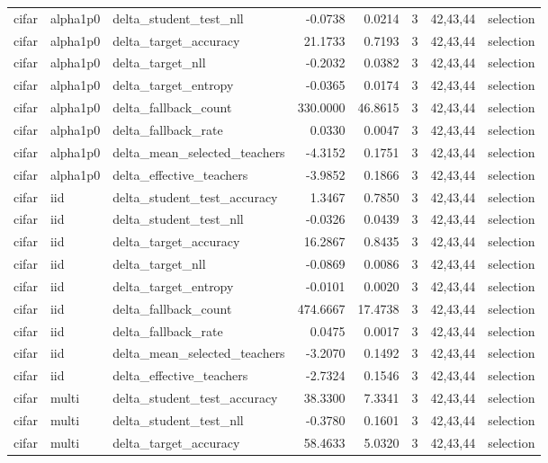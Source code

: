 \begin{tabular}{lllrrrll}
cifar & alpha1p0 & delta\_student\_test\_nll & -0.0738 & 0.0214 & 3 & 42,43,44 & selection \\
cifar & alpha1p0 & delta\_target\_accuracy & 21.1733 & 0.7193 & 3 & 42,43,44 & selection \\
cifar & alpha1p0 & delta\_target\_nll & -0.2032 & 0.0382 & 3 & 42,43,44 & selection \\
cifar & alpha1p0 & delta\_target\_entropy & -0.0365 & 0.0174 & 3 & 42,43,44 & selection \\
cifar & alpha1p0 & delta\_fallback\_count & 330.0000 & 46.8615 & 3 & 42,43,44 & selection \\
cifar & alpha1p0 & delta\_fallback\_rate & 0.0330 & 0.0047 & 3 & 42,43,44 & selection \\
cifar & alpha1p0 & delta\_mean\_selected\_teachers & -4.3152 & 0.1751 & 3 & 42,43,44 & selection \\
cifar & alpha1p0 & delta\_effective\_teachers & -3.9852 & 0.1866 & 3 & 42,43,44 & selection \\
cifar & iid & delta\_student\_test\_accuracy & 1.3467 & 0.7850 & 3 & 42,43,44 & selection \\
cifar & iid & delta\_student\_test\_nll & -0.0326 & 0.0439 & 3 & 42,43,44 & selection \\
cifar & iid & delta\_target\_accuracy & 16.2867 & 0.8435 & 3 & 42,43,44 & selection \\
cifar & iid & delta\_target\_nll & -0.0869 & 0.0086 & 3 & 42,43,44 & selection \\
cifar & iid & delta\_target\_entropy & -0.0101 & 0.0020 & 3 & 42,43,44 & selection \\
cifar & iid & delta\_fallback\_count & 474.6667 & 17.4738 & 3 & 42,43,44 & selection \\
cifar & iid & delta\_fallback\_rate & 0.0475 & 0.0017 & 3 & 42,43,44 & selection \\
cifar & iid & delta\_mean\_selected\_teachers & -3.2070 & 0.1492 & 3 & 42,43,44 & selection \\
cifar & iid & delta\_effective\_teachers & -2.7324 & 0.1546 & 3 & 42,43,44 & selection \\
cifar & multi & delta\_student\_test\_accuracy & 38.3300 & 7.3341 & 3 & 42,43,44 & selection \\
cifar & multi & delta\_student\_test\_nll & -0.3780 & 0.1601 & 3 & 42,43,44 & selection \\
cifar & multi & delta\_target\_accuracy & 58.4633 & 5.0320 & 3 & 42,43,44 & selection \\

\end{tabular}
